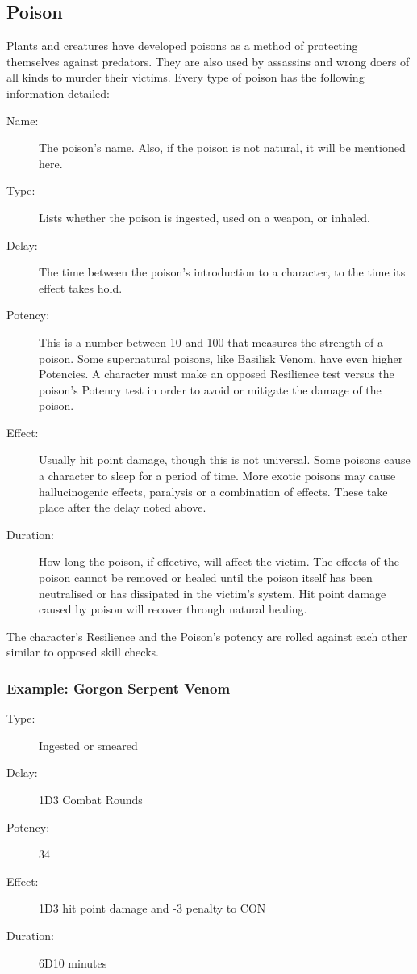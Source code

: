 \subsection{Poison}
Plants and creatures have developed poisons as a method of protecting themselves against predators. They are also used by assassins and wrong doers of all kinds to murder their victims.  
Every type of poison has the following information detailed: 

\begin{description}
	\item[Name:] The poison’s name. Also, if the poison is not natural, it will be mentioned here. 
	\item[Type:] Lists whether the poison is ingested, used on a weapon, or inhaled. 
	\item[Delay:] The time between the poison’s introduction to a character, to the time its effect takes hold. 
	\item[Potency:] This is a number between 10 and 100 that measures the strength of a poison. Some supernatural poisons, like Basilisk Venom, have even higher Potencies. A character must make an opposed Resilience test versus the poison’s Potency test in order to avoid or mitigate the damage of the poison. 
	\item[Effect:] Usually hit point damage, though this is not universal. Some poisons cause a character to sleep for a period of time. More exotic poisons may cause hallucinogenic effects, paralysis or a combination of effects. These take place after the delay noted above. 
	\item[Duration:] How long the poison, if effective, will affect the victim. The effects of the poison cannot be removed or healed until the poison itself has been neutralised or has dissipated in the victim’s system. Hit point damage caused by poison will recover through natural healing. 
\end{description}

The character's Resilience and the Poison's potency are rolled against each other similar to opposed skill checks.

\subsubsection{Example: Gorgon Serpent Venom}

\begin{description}
\item[Type:] Ingested or smeared
\item[Delay:] 1D3 Combat Rounds
\item[Potency:] 34
\item[Effect:] 1D3 hit point damage and -3 penalty to CON
\item[Duration:] 6D10 minutes
\end{description}

